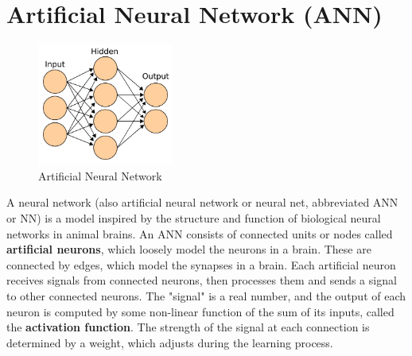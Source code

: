 \section{Artificial Neural Network (ANN) \cite{wiki-ann}}\label{ann}
\begin{figure}[H]
    \centering
    \includegraphics[height=4cm]{Pictures/deep_neural_networks/ann.png}
    \caption{Artificial Neural Network}
\end{figure}
A neural network (also artificial neural network or neural net, abbreviated ANN or NN) is a model inspired by the structure and function of biological neural networks in animal brains. An ANN consists of connected units or nodes called \textbf{artificial neurons}, which loosely model the neurons in a brain. These are connected by edges, which model the synapses in a brain. Each artificial neuron receives signals from connected neurons, then processes them and sends a signal to other connected neurons. The "signal" is a real number, and the output of each neuron is computed by some non-linear function of the sum of its inputs, called the \textbf{activation function}. The strength of the signal at each connection is determined by a weight, which adjusts during the learning process.

